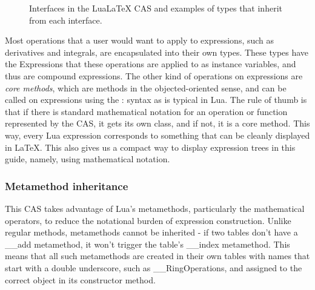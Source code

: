 \documentclass{article}
\begin{document}
\begin{figure}[h]
\centering


\caption{Interfaces in the Lua\LaTeX{} CAS and examples of types that inherit from each interface.}

\end{figure}

Most operations that a user would want to apply to expressions, such as derivatives and integrals, are encapsulated into their own types. These types have the {\ttfamily Expression}s that these operations are applied to as instance variables, and thus are compound expressions. The other kind of operations on expressions are \emph{core methods}, which are methods in the objected-oriented sense, and can be called on expressions using the {\ttfamily :} syntax as is typical in Lua. The rule of thumb is that if there is standard mathematical notation for an operation or function represented by the CAS, it gets its own class, and if not, it is a core method. This way, every Lua expression corresponds to something that can be cleanly displayed in \LaTeX{}. This also gives us a compact way to display expression trees in this guide, namely, using mathematical notation.


\subsubsection{Metamethod inheritance}
This CAS takes advantage of Lua's metamethods, particularly the mathematical operators, to reduce the notational burden of expression construction. Unlike regular methods, metamethods cannot be inherited - if two tables don't have a {\ttfamily \_\_add} metamethod, it won't trigger the table's {\ttfamily \_\_index} metamethod. This means that all such metamethods are created in their own tables with names that start with a double underscore, such as {\ttfamily \_\_RingOperations}, and assigned to the correct object in its constructor method.
\end{document}
